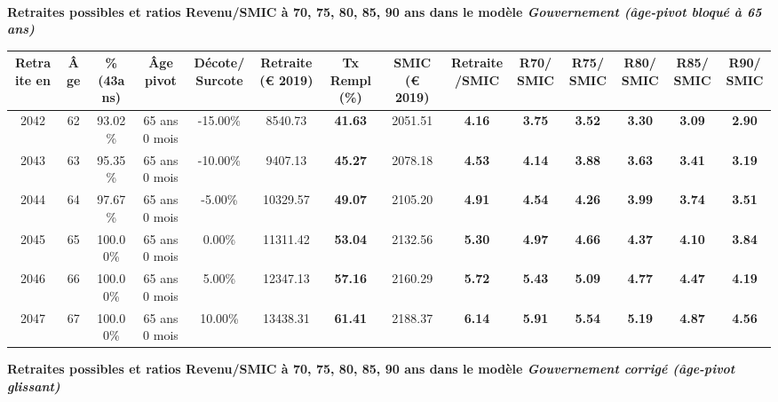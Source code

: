  ~\\{\bf \noindent Retraites possibles et ratios Revenu/SMIC à 70, 75, 80, 85, 90 ans dans le modèle \emph{Gouvernement (âge-pivot bloqué à 65 ans)}}  
 
\begin{adjustbox}{max width=\textwidth} 
\begin{tabular}[htb]{|c|c||c|c|c||c|c||c|c||c|c|c|c|c|} 
\hline 
 Retraite en &  Âge &  \%(43ans) &  Âge pivot &  Décote/Surcote &  Retraite (\euro{} 2019) &  Tx Rempl(\%) &  SMIC (\euro{} 2019) &  Retraite/SMIC &  R70/SMIC &  R75/SMIC &  R80/SMIC &  R85/SMIC &  R90/SMIC \\ 
\hline \hline 
 2042 &  62 &  93.02\% &  65 ans 0 mois &  -15.00\% &  8540.73 &  {\bf 41.63} &  2051.51 &  {\bf 4.16} &  {\bf 3.75} &  {\bf 3.52} &  {\bf 3.30} &  {\bf 3.09} &  {\bf 2.90} \\ 
\hline 
 2043 &  63 &  95.35\% &  65 ans 0 mois &  -10.00\% &  9407.13 &  {\bf 45.27} &  2078.18 &  {\bf 4.53} &  {\bf 4.14} &  {\bf 3.88} &  {\bf 3.63} &  {\bf 3.41} &  {\bf 3.19} \\ 
\hline 
 2044 &  64 &  97.67\% &  65 ans 0 mois &  -5.00\% &  10329.57 &  {\bf 49.07} &  2105.20 &  {\bf 4.91} &  {\bf 4.54} &  {\bf 4.26} &  {\bf 3.99} &  {\bf 3.74} &  {\bf 3.51} \\ 
\hline 
 2045 &  65 &  100.00\% &  65 ans 0 mois &  0.00\% &  11311.42 &  {\bf 53.04} &  2132.56 &  {\bf 5.30} &  {\bf 4.97} &  {\bf 4.66} &  {\bf 4.37} &  {\bf 4.10} &  {\bf 3.84} \\ 
\hline 
 2046 &  66 &  100.00\% &  65 ans 0 mois &  5.00\% &  12347.13 &  {\bf 57.16} &  2160.29 &  {\bf 5.72} &  {\bf 5.43} &  {\bf 5.09} &  {\bf 4.77} &  {\bf 4.47} &  {\bf 4.19} \\ 
\hline 
 2047 &  67 &  100.00\% &  65 ans 0 mois &  10.00\% &  13438.31 &  {\bf 61.41} &  2188.37 &  {\bf 6.14} &  {\bf 5.91} &  {\bf 5.54} &  {\bf 5.19} &  {\bf 4.87} &  {\bf 4.56} \\ 
\hline 
\hline 
\end{tabular} 
\end{adjustbox} 
 
 \vspace{0.1cm} 
{\bf \noindent Retraites possibles et ratios Revenu/SMIC à 70, 75, 80, 85, 90 ans dans le modèle \emph{Gouvernement corrigé (âge-pivot glissant)}}  
 
